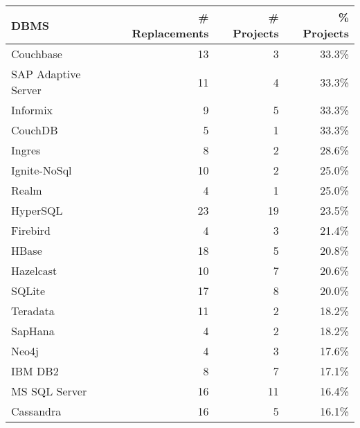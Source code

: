 \begin{tabular}{lrrr}
\hline
        \textbf{DBMS} & \textbf{\# Replacements} & \textbf{\# Projects} & \textbf{\% Projects} \\
\hline
             Couchbase &                       13 &                    3 &                33.3\% \\
   SAP Adaptive Server &                       11 &                    4 &                33.3\% \\
              Informix &                        9 &                    5 &                33.3\% \\
               CouchDB &                        5 &                    1 &                33.3\% \\
                Ingres &                        8 &                    2 &                28.6\% \\
          Ignite-NoSql &                       10 &                    2 &                25.0\% \\
                 Realm &                        4 &                    1 &                25.0\% \\
              HyperSQL &                       23 &                   19 &                23.5\% \\
              Firebird &                        4 &                    3 &                21.4\% \\
                 HBase &                       18 &                    5 &                20.8\% \\
             Hazelcast &                       10 &                    7 &                20.6\% \\
                SQLite &                       17 &                    8 &                20.0\% \\
              Teradata &                       11 &                    2 &                18.2\% \\
               SapHana &                        4 &                    2 &                18.2\% \\
                 Neo4j &                        4 &                    3 &                17.6\% \\
               IBM DB2 &                        8 &                    7 &                17.1\% \\
         MS SQL Server &                       16 &                   11 &                16.4\% \\
             Cassandra &                       16 &                    5 &                16.1\% \\

\end{tabular}
